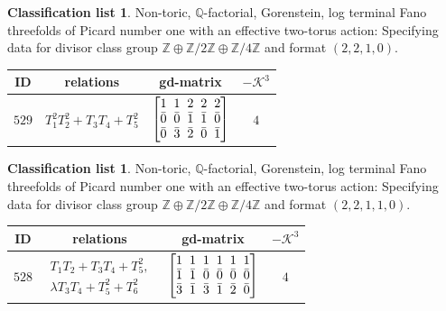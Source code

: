\documentclass[pdftex]{sigma}%
\theoremstyle{definition}
\newtheorem{class-list}[thm]{Classification list}
\def\ZZ{{\mathbb Z}}
\def\QQ{{\mathbb Q}}
\numberwithin{equation}{section}
\begin{document}
\begin{class-list}\label{class-list(0,2,4)}
Non-toric, $\QQ$-factorial, Gorenstein, log terminal Fano
threefolds of Picard number one with an effective two-torus action:
Specifying data for divisor class group
$\ZZ\oplus \ZZ/2\ZZ\oplus \ZZ/4\ZZ$ and format $(2,2,1,0)$.
\begin{table}[h!]\centering\setlength{\tabcolsep}{5.5pt}
\renewcommand{\arraystretch}{1.1}\small\tabulinesep=1mm
\begin{tabu}{c|c|c|c}
\hline
ID&relations&gd-matrix&$-\mathcal{K}^3$
\\
\hline
${529}$&${T_{1}^{2}T_{2}^{2}+T_{3}T_{4}+T_{5}^{2}}$
&$\arraycolsep=1mm\begin{bmatrix}{1} & {1} & {2} & {2} & {2} \\ {\bar{0}} & {\bar{0}} & {\bar{1}} & {\bar{1}} & {\bar{0}} \\ {\bar{0}} & {\bar{3}} & {\bar{2}} & {\bar{0}} & {\bar{1}}\end{bmatrix}$
&${4}$
\\
\hline
\end{tabu}\vspace{-2mm}
\end{table}
\end{class-list}


\begin{class-list}
Non-toric, $\QQ$-factorial, Gorenstein, log terminal Fano
threefolds of Picard number one with an effective two-torus action:
Specifying data for divisor class group
$\ZZ\oplus \ZZ/2\ZZ\oplus \ZZ/4\ZZ$ and format $(2,2,1,1,0)$.
\begin{table}[h!]\centering\setlength{\tabcolsep}{5.5pt}
\renewcommand{\arraystretch}{1.1}\small\tabulinesep=1mm
\begin{tabu}{c|c|c|c}
\hline
ID&relations&gd-matrix&$-\mathcal{K}^3$
\\
\hline
${528}$&$\begin{array}{r}{T_{1}T_{2}+T_{3}T_{4}+T_{5}^{2}},\\ {\lambda T_{3}T_{4}+T_{5}^{2}+T_{6}^{2}}\end{array}$
&$\arraycolsep=1mm\begin{bmatrix}{1} & {1} & {1} & {1} & {1} & {1} \\ {\bar{1}} & {\bar{1}} & {\bar{0}} & {\bar{0}} & {\bar{0}} & {\bar{0}} \\ {\bar{3}} & {\bar{1}} & {\bar{3}} & {\bar{1}} & {\bar{2}} & {\bar{0}}\end{bmatrix}$&${4}$
\\
\hline
\end{tabu}\vspace{-2mm}
\end{table}
\end{class-list}
\end{document}
